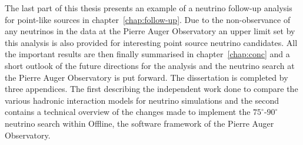 The last part of this thesis presents an example of a neutrino follow-up analysis for point-like sources in chapter~\ref{chap:follow-up}. Due to the non-observance of any neutrinos in the data at the Pierre Auger Observatory an upper limit set by this analysis is also provided for interesting point source neutrino candidates. All the important results are then finally summarised in chapter~\ref{chap:conc} and a short outlook of the future directions for the analysis and the neutrino search at the Pierre Auger Observatory is put forward. The dissertation is completed by three appendices. The first describing the independent work done to compare the various hadronic interaction models for neutrino simulations and the second contains a technical overview of the changes made to implement the $75^\circ$-$90^\circ$ neutrino search within Offline, the software framework of the Pierre Auger Observatory. 

